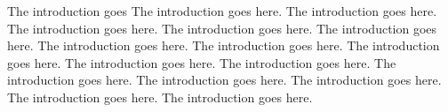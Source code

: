 The introduction goes \cite{Grosz_and_Sidner_1986}
The introduction goes here.
The introduction goes here.
The introduction goes here.
The introduction goes here.
The introduction goes here.
The introduction goes here.
The introduction goes here.
The introduction goes here.
The introduction goes here.
The introduction goes here.
The introduction goes here.
The introduction goes here.
The introduction goes here.
The introduction goes here.
The introduction goes here.
